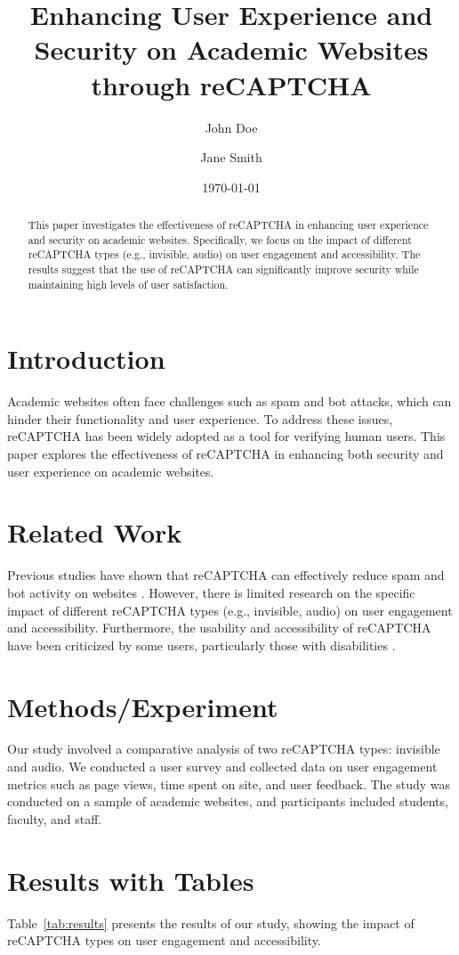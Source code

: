 \documentclass{article}
\title{Enhancing User Experience and Security on Academic Websites through reCAPTCHA}
\author{John Doe \and Jane Smith}
\date{\today}
\begin{document}
\maketitle

\begin{abstract}
This paper investigates the effectiveness of reCAPTCHA in enhancing user experience and security on academic websites. Specifically, we focus on the impact of different reCAPTCHA types (e.g., invisible, audio) on user engagement and accessibility. The results suggest that the use of reCAPTCHA can significantly improve security while maintaining high levels of user satisfaction.
\end{abstract}

\section{Introduction}
Academic websites often face challenges such as spam and bot attacks, which can hinder their functionality and user experience. To address these issues, reCAPTCHA has been widely adopted as a tool for verifying human users. This paper explores the effectiveness of reCAPTCHA in enhancing both security and user experience on academic websites.

\section{Related Work}
Previous studies have shown that reCAPTCHA can effectively reduce spam and bot activity on websites \cite{ref1}. However, there is limited research on the specific impact of different reCAPTCHA types (e.g., invisible, audio) on user engagement and accessibility. Furthermore, the usability and accessibility of reCAPTCHA have been criticized by some users, particularly those with disabilities \cite{ref2}.

\section{Methods/Experiment}
Our study involved a comparative analysis of two reCAPTCHA types: invisible and audio. We conducted a user survey and collected data on user engagement metrics such as page views, time spent on site, and user feedback. The study was conducted on a sample of academic websites, and participants included students, faculty, and staff.

\section{Results with Tables}
Table~\ref{tab:results} presents the results of our study, showing the impact of reCAPTCHA types on user engagement and accessibility.
\end{document}
